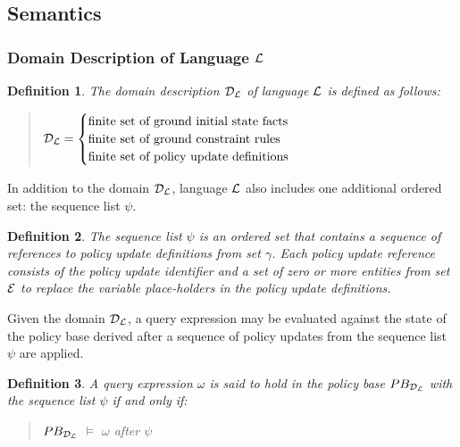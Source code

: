 \documentclass[10pt, twocolumn]{article}
\newtheorem{definition}{Definition}
\begin{document}
    \subsection{Semantics}

      \subsubsection{Domain Description of Language ${\cal L}$}

        \begin{definition}
          The domain description ${\cal D}_{\cal L}$ of language ${\cal L}$ is
          defined as follows:

          \begin{quote}
            \begin{math}
              {\cal D}_{\cal L} = 
              \begin{cases}
                \mbox{finite set of ground initial state facts} \\
                \mbox{finite set of ground constraint rules} \\
                \mbox{finite set of policy update definitions}
              \end{cases}
            \end{math}
          \end{quote}

        \end{definition}

        In addition to the domain ${\cal D}_{\cal L}$, language ${\cal L}$
        also includes one additional ordered set: the sequence list $\psi$.

        \begin{definition}
          The sequence list $\psi$ is an ordered set that contains a sequence 
          of references to policy update definitions from set $\gamma$. Each
          policy update reference consists of the policy update identifier and
          a set of zero or more entities from set ${\cal E}$ to replace the
          variable place-holders in the policy update definitions.
        \end{definition}

        Given the domain ${\cal D}_{\cal L}$, a query expression may be
        evaluated against the state of the policy base derived after a sequence
        of policy updates from the sequence list $\psi$ are applied.

        \begin{definition}
          A query expression $\omega$ is said to hold in the policy base
          $PB_{{\cal D}_{\cal L}}$ with the sequence list $\psi$ if and only
          if:

          \begin{quote}
            $PB_{{\cal D}_{\cal L}}$ $\models$ $\omega$ after $\psi$
          \end{quote}
          
        \end{definition}
\end{document}
